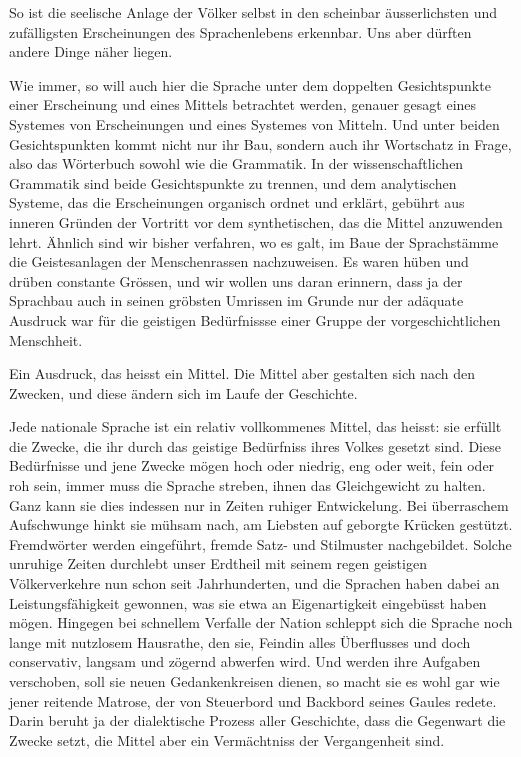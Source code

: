 So ist die seelische Anlage der Völker selbst in den scheinbar äusserlichsten und zufälligsten Erscheinungen des Sprachenlebens erkennbar. Uns aber dürften andere Dinge näher liegen.

Wie immer, so will auch hier die Sprache unter dem doppelten Gesichtspunkte einer Erscheinung und eines Mittels betrachtet werden, \label{fp.408} genauer gesagt eines Systemes von Erscheinungen und eines Systemes von Mitteln. Und unter beiden Gesichtspunkten kommt nicht nur ihr Bau, sondern auch ihr Wortschatz in Frage, also das Wörterbuch sowohl wie die Grammatik. In der wissenschaftlichen Grammatik sind beide Gesichtspunkte zu trennen, und dem analytischen Systeme, das die Erscheinungen organisch ordnet und erklärt, gebührt aus inneren Gründen der Vortritt vor dem synthetischen, das die Mittel anzuwenden lehrt. Ähnlich sind wir bisher verfahren, wo es galt, im Baue der Sprachstämme die Geistesanlagen der Menschenrassen nachzuweisen. Es waren hüben und drüben constante Grössen, und wir wollen uns daran erinnern, dass ja der Sprachbau auch in seinen gröbsten Umrissen im Grunde nur der adäquate Ausdruck war für die geistigen Bedürfnissse einer Gruppe der vorgeschichtlichen Menschheit.

Ein Ausdruck, das heisst ein Mittel. Die Mittel aber gestalten sich nach den Zwecken, und diese ändern sich im Laufe der Geschichte.

Jede nationale Sprache ist ein relativ vollkommenes Mittel, das heisst: sie erfüllt die Zwecke, die ihr durch das geistige Bedürfniss ihres Volkes gesetzt sind. Diese Bedürfnisse und jene Zwecke mögen hoch oder niedrig, eng oder weit, fein oder roh sein, immer muss die Sprache streben, ihnen das Gleichgewicht zu halten. Ganz kann sie dies indessen nur in Zeiten ruhiger Entwickelung. Bei überraschem Aufschwunge hinkt sie mühsam nach, am Liebsten auf geborgte Krücken gestützt. Fremdwörter werden eingeführt, fremde Satz- und Stilmuster nachgebildet. Solche unruhige Zeiten durchlebt unser Erdtheil mit seinem regen geistigen Völkerverkehre nun schon seit Jahrhunderten, und die Sprachen haben dabei an Leistungsfähigkeit gewonnen, was sie etwa an Eigenartigkeit eingebüsst haben mögen. Hingegen bei schnellem Verfalle der Nation schleppt sich die Sprache noch lange mit nutzlosem Hausrathe, den sie, Feindin alles Überflusses und doch conservativ, langsam und zögernd abwerfen wird. Und werden ihre Aufgaben verschoben, soll sie neuen Gedankenkreisen dienen, so macht sie es wohl gar wie jener reitende Matrose, der von Steuerbord und Backbord seines Gaules redete. Darin beruht ja der dialektische Prozess aller Geschichte, dass die Gegenwart die Zwecke setzt, die Mittel aber ein Vermächtniss der Vergangenheit sind.

